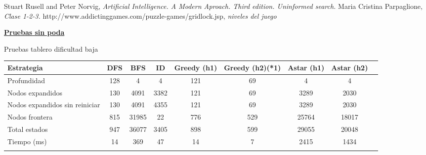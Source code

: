 \documentclass[10pt,journal,compsoc]{IEEEtran}
\begin{document}





%
%
%
\begin{thebibliography}{1}

Stuart Rusell and Peter Norvig, \emph{Artificial Intelligence. A Modern Aproach. Third edition. Uninformed search.}
Maria Cristina Parpaglione, \emph{Clase 1-2-3.}
http://www.addictinggames.com/puzzle-games/gridlock.jsp, \emph{niveles del juego}
\end{thebibliography}


\newpage
\clearpage
{\bf\underline{Pruebas sin poda}}

Pruebas tablero dificultad baja

\begin{tabular}{l c c c c c c c c}
\hline\hline
Estrategia & DFS & BFS & ID & Greedy (h1) & Greedy (h2)(*1) & Astar (h1) & Astar (h2)\\
\hline
Profundidad	 & 128 & 4 & 4 & 121 & 69 & 4 & 4\\
Nodos expandidos 	 & 130 & 4091 & 3382 & 121 & 69 & 3289 & 2030\\
Nodos expandidos sin reiniciar & 130 & 4091 & 4355 & 121 & 69 & 3289 & 2030\\
Nodos frontera 	& 815 & 31985 & 22 & 776 & 529 & 25764 & 18017\\
Total estados 	& 947 & 36077 & 3405 & 898 & 599 & 29055 & 20048\\
Tiempo (ms)		& 14 & 369 & 47 & 14 & 7 & 2415 & 1434\\
\hline\hline
\label{board1_sinpoda}
\end{tabular}
\end{document}
